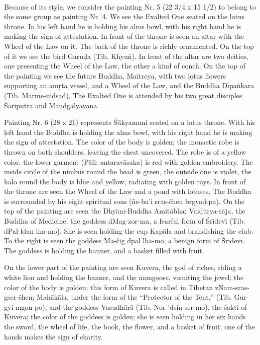\documentclass[a4paper, 12pt, oneside]{article}
\begin{document}
\paragraph{}
Because of its style, we consider the painting Nr. 5 (22 3/4 x 15 1/2) to belong to the same group as painting Nr. 4. We see the Exalted One seated on the lotus throne. In his left hand he is holding his alms bowl, with his right hand he is making the sign of attestation. In front of the throne is seen an altar with the Wheel of the Law on it. The back of the throne is richly ornamented. On the top of it we see the bird Garu\d{d}a (Tib. Khyu\.{n}). In front of the altar are two deities, one presenting the Wheel of the Law, the other a kind of conch. On the top of the painting we see the future Buddha, Maitreya, with two lotus flowers supporting an am\d{r}ta vessel, and a Wheel of the Law, and the Buddha D\={\i}pa\.{n}kara (Tib. Marme-mdsad). The Exalted One is attended by his two great disciples \'{S}\={a}riputra and Maudgaly\={a}yana.

\bigskip

Painting Nr. 6 (28 x 21) represents \'{S}\={a}kyamuni seated on a lotus throne. With his left hand the Buddha is holding the alms bowl, with his right hand he is making the sign of attestation. The color of the body is golden; the monastic robe is thrown on both shoulders, leaving the chest uncovered. The robe is of a yellow color, the lower garment (P\={a}li: antarav\={a}saka) is red with golden embroidery. The inside circle of the nimbus round the head is green, the outside one is violet, the halo round the body is blue and yellow, radiating with golden rays. In front of the throne are seen the Wheel of the Law and a pond with lotuses, The Buddha is surrounded by his eight spiritual sons (\~{n}e-ba'i sras-čhen brgyad-pa). On the top of the painting are seen the Dhy\={a}ni-Buddha Amit\={a}bha: Vai\d{d}\={u}rya-r\={a}ja, the Buddha of Medicine; the goddess dMag-zor-ma, a fearful form of \'{S}r\={\i}dev\={\i} (Tib. dPal-ldan lha-mo). She is seen holding the cup Kap\={a}la and brandishing the club. To the right is seen the goddess Ma-čig dpal lha-mo, a benign form of \'{S}r\={\i}dev\={\i}. The goddess is holding the banner, and a basket filled with fruit.

On the lower part of the painting are seen Kuvera, the god of riches, riding a white lion and holding the banner, and the mongoose, vomiting the jewel; the color of the body is golden; this form of Kuvera is called in Tibetan zNam-sras-gser-čhen; Mah\={a}k\={a}la, under the form of the ``Protector of the Tent,'' (Tib. Gur-gyi mgon-po); and the goddess Vasudh\={a}r\={a} (Tib. Nor-'dsin ser-mo), the \'{s}akti of Kuvera; the color of the goddess is golden; she is seen holding in her six hands the sword, the wheel of life, the book, the flower, and a basket of fruit; one of the hands makes the sign of charity.
\end{document}
